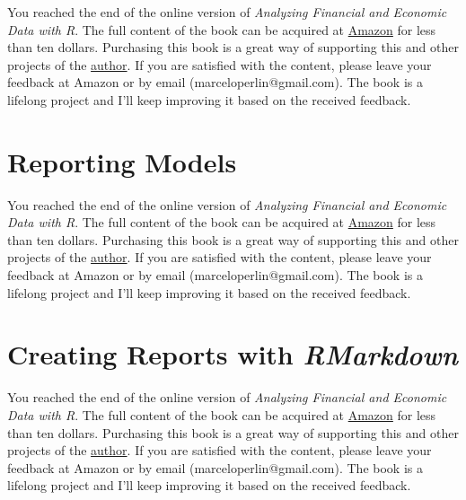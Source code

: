 \documentclass[
  12pt,
]{book}
\newenvironment{pleasebuyit}
{\begin{noteblock}
		
	} {\end{noteblock}}
\begin{document}
\begin{pleasebuyit}
You reached the end of the online version of \emph{Analyzing Financial
and Economic Data with R}. The full content of the book can be acquired
at \href{https://www.amazon.com/dp/B084LSNXMN}{Amazon} for less than ten
dollars. Purchasing this book is a great way of supporting this and
other projects of the \href{https://www.msperlin.com/}{author}. If you
are satisfied with the content, please leave your feedback at Amazon or
by email (marceloperlin@gmail.com). The book is a lifelong project and
I'll keep improving it based on the received feedback.
\end{pleasebuyit}

\hypertarget{reporting-models}{%
\section{Reporting Models}\label{reporting-models}}

\begin{pleasebuyit}
You reached the end of the online version of \emph{Analyzing Financial
and Economic Data with R}. The full content of the book can be acquired
at \href{https://www.amazon.com/dp/B084LSNXMN}{Amazon} for less than ten
dollars. Purchasing this book is a great way of supporting this and
other projects of the \href{https://www.msperlin.com/}{author}. If you
are satisfied with the content, please leave your feedback at Amazon or
by email (marceloperlin@gmail.com). The book is a lifelong project and
I'll keep improving it based on the received feedback.
\end{pleasebuyit}

\hypertarget{creating-rmarkdown}{%
\section{\texorpdfstring{Creating Reports with \emph{RMarkdown}}{Creating Reports with RMarkdown}}\label{creating-rmarkdown}}

\begin{pleasebuyit}
You reached the end of the online version of \emph{Analyzing Financial
and Economic Data with R}. The full content of the book can be acquired
at \href{https://www.amazon.com/dp/B084LSNXMN}{Amazon} for less than ten
dollars. Purchasing this book is a great way of supporting this and
other projects of the \href{https://www.msperlin.com/}{author}. If you
are satisfied with the content, please leave your feedback at Amazon or
by email (marceloperlin@gmail.com). The book is a lifelong project and
I'll keep improving it based on the received feedback.
\end{pleasebuyit}
\end{document}
